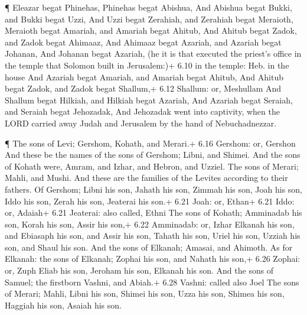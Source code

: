  ¶ Eleazar begat Phinehas, Phinehas begat Abishua,
 And Abishua begat Bukki, and Bukki begat Uzzi, 
And Uzzi begat Zerahiah, and Zerahiah begat Meraioth, 
Meraioth begat Amariah, and Amariah begat Ahitub,  And
Ahitub begat Zadok, and Zadok begat Ahimaaz,  And Ahimaaz
begat Azariah, and Azariah begat Johanan,  And Johanan
begat Azariah, (he it is that executed the priest's office in the temple
that Solomon built in Jerusalem:)+ 6.10 in the temple: Heb. in the house
 And Azariah begat Amariah, and Amariah begat Ahitub,
 And Ahitub begat Zadok, and Zadok begat Shallum,+ 6.12
Shallum: or, Meshullam  And Shallum begat Hilkiah, and
Hilkiah begat Azariah,  And Azariah begat Seraiah, and
Seraiah begat Jehozadak,  And Jehozadak went into
captivity, when the LORD carried away Judah and Jerusalem by the hand of
Nebuchadnezzar.

 ¶ The sons of Levi; Gershom, Kohath, and Merari.+ 6.16
Gershom: or, Gershon  And these be the names of the sons of
Gershom; Libni, and Shimei.  And the sons of Kohath were,
Amram, and Izhar, and Hebron, and Uzziel.  The sons of
Merari; Mahli, and Mushi. And these are the families of the Levites
according to their fathers.  Of Gershom; Libni his son,
Jahath his son, Zimmah his son,  Joah his son, Iddo his
son, Zerah his son, Jeaterai his son.+ 6.21 Joah: or, Ethan+ 6.21 Iddo:
or, Adaiah+ 6.21 Jeaterai: also called, Ethni  The sons of
Kohath; Amminadab his son, Korah his son, Assir his son,+ 6.22
Amminadab: or, Izhar  Elkanah his son, and Ebiasaph his
son, and Assir his son,  Tahath his son, Uriel his son,
Uzziah his son, and Shaul his son.  And the sons of
Elkanah; Amasai, and Ahimoth.  As for Elkanah: the sons of
Elkanah; Zophai his son, and Nahath his son,+ 6.26 Zophai: or, Zuph
 Eliab his son, Jeroham his son, Elkanah his son.
 And the sons of Samuel; the firstborn Vashni, and Abiah.+
6.28 Vashni: called also Joel  The sons of Merari; Mahli,
Libni his son, Shimei his son, Uzza his son,  Shimea his
son, Haggiah his son, Asaiah his son.

